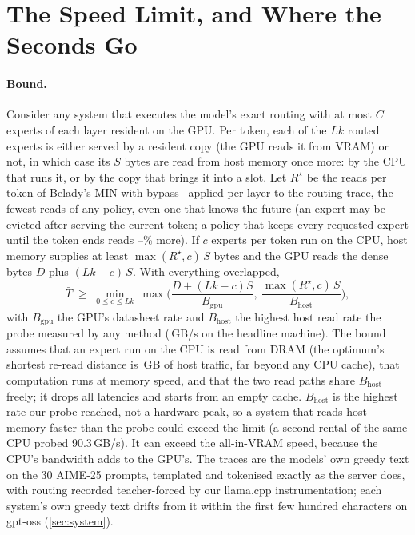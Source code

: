 \documentclass[10pt,twocolumn]{article}
\begin{document}
\section{The Speed Limit, and Where the Seconds Go}\label{sec:limit}
\paragraph{Bound.} Consider any system that executes the model's exact routing with at most $C$ experts of each layer
resident on the GPU. Per token, each of the $Lk$ routed experts is either served by a resident copy (the GPU reads it
from VRAM) or not, in which case its $S$ bytes are read from host memory once more: by the CPU that runs it, or by the
copy that brings it into a slot. Let $R^\star$ be the reads per token of Belady's MIN with bypass~\cite{belady1966study,hasslinger2018,bypassopt}
applied per layer to the routing trace, the fewest reads of any policy, even one that knows the future (an expert may
be evicted after serving the current token; a policy that keeps every requested expert until the token ends reads
\exactReadsMoreMin--\exactReadsMoreMax\% more). If $c$ experts per token run on the CPU, host memory supplies at least
$\max(R^\star,c)\,S$ bytes and the GPU reads the dense bytes $D$ plus $(Lk-c)\,S$. With everything overlapped,
\begin{equation}
\bar T \;\ge\; \min_{0\le c\le Lk}\ \max\!\Big(\frac{D+(Lk-c)S}{B_{\mathrm{gpu}}},\ \frac{\max(R^\star\!,c)\,S}{B_{\mathrm{host}}}\Big),
\label{eq:limit}
\end{equation}
with $B_{\mathrm{gpu}}$ the GPU's datasheet rate and $B_{\mathrm{host}}$ the highest host read rate the probe measured
by any method (\bHost\,GB/s on the headline machine). The bound assumes that an expert run on the CPU is read from DRAM
(the optimum's shortest re-read distance is \lthreeReuseMin\,GB of host traffic, far beyond any CPU cache), that
computation runs at memory speed, and that the two read paths share $B_{\mathrm{host}}$ freely; it drops all
latencies and starts from an empty cache. $B_{\mathrm{host}}$ is the highest rate our probe reached, not a hardware
peak, so a system that reads host memory faster than the probe could exceed the limit (a second rental of the same
CPU probed 90.3\,GB/s). It can exceed the all-in-VRAM speed, because the CPU's bandwidth adds to the GPU's. The traces are the models' own greedy text on the 30 AIME-25 prompts, templated and tokenised exactly as the
server does, with routing recorded teacher-forced by our llama.cpp instrumentation; each system's own greedy text
drifts from it within the first few hundred characters on gpt-oss (\cref{sec:system}).
\end{document}
